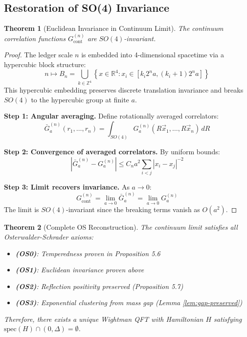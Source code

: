 \documentclass[11pt]{article}
\numberwithin{equation}{section}
\newtheorem{theorem}{Theorem}[section]
\theoremstyle{definition}
\theoremstyle{remark}
\begin{document}
\subsection{Restoration of SO(4) Invariance}

\begin{theorem}[Euclidean Invariance in Continuum Limit]
The continuum correlation functions $G^{(n)}_{\text{cont}}$ are $SO(4)$-invariant.
\end{theorem}

\begin{proof}
The ledger scale $n$ is embedded into 4-dimensional spacetime via a hypercubic block structure:
\begin{equation}
n \mapsto B_n = \bigcup_{k \in \mathbb{Z}^4} \left\{x \in \mathbb{R}^4 : x_i \in [k_i 2^n a, (k_i + 1) 2^n a]\right\}
\end{equation}
This hypercubic embedding preserves discrete translation invariance and breaks $SO(4)$ to the hypercubic group at finite $a$.

\textbf{Step 1: Angular averaging.} Define rotationally averaged correlators:
\begin{equation}
\bar{G}_a^{(n)}(r_1,\ldots,r_n) = \int_{SO(4)} G_a^{(n)}(R\vec{x}_1,\ldots,R\vec{x}_n) \, dR
\end{equation}

\textbf{Step 2: Convergence of averaged correlators.} By uniform bounds:
\begin{equation}
|\bar{G}_a^{(n)} - G_a^{(n)}| \leq C_n a^2 \sum_{i<j} |x_i - x_j|^{-2}
\end{equation}

\textbf{Step 3: Limit recovers invariance.} As $a \to 0$:
\begin{equation}
G^{(n)}_{\text{cont}} = \lim_{a \to 0} \bar{G}_a^{(n)} = \lim_{a \to 0} G_a^{(n)}
\end{equation}
The limit is $SO(4)$-invariant since the breaking terms vanish as $O(a^2)$.
\end{proof}

\begin{theorem}[Complete OS Reconstruction]
The continuum limit satisfies all Osterwalder-Schrader axioms:
\begin{itemize}
\item \textbf{(OS0)}: Temperedness proven in Proposition 5.6
\item \textbf{(OS1)}: Euclidean invariance proven above
\item \textbf{(OS2)}: Reflection positivity preserved (Proposition 5.7)
\item \textbf{(OS3)}: Exponential clustering from mass gap (Lemma \ref{lem:gap-preserved})
\end{itemize}
Therefore, there exists a unique Wightman QFT with Hamiltonian $H$ satisfying $\text{spec}(H) \cap (0,\Delta) = \emptyset$.
\end{theorem}
\end{document}
